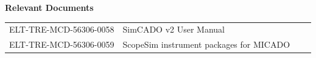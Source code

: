 \documentclass[a4paper,11pt]{article}
\begin{document}
\begin{center}
  \textbf{Relevant Documents}

  \tabletail{\hline}

  \begin{supertabular}{|l|l|l|l|}
   ELT-TRE-MCD-56306-0058 & SimCADO v2 User Manual \\
   ELT-TRE-MCD-56306-0059 & ScopeSim instrument packages for MICADO \\
   \hline
  \end{supertabular}

\end{center}


\setcounter{tocdepth}{3}
\tableofcontents
\cleardoublepage






\end{document}
